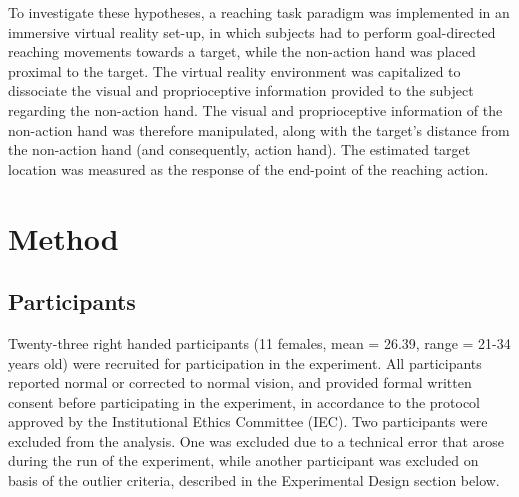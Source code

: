 
To investigate these hypotheses, a reaching task paradigm was implemented in an immersive virtual reality set-up, in which subjects had to perform goal-directed reaching movements towards a target, while the non-action hand was placed proximal to the target. The virtual reality environment was capitalized to dissociate the visual and proprioceptive information provided to the subject regarding the non-action hand. The visual and proprioceptive information of the non-action hand was therefore manipulated, along with the target's distance from the non-action hand (and consequently, action hand). The estimated target location was measured as the response of the end-point of the reaching action. 
 


\section{Method}

\subsection{Participants}
Twenty-three right handed participants (11 females, mean = 26.39, range = 21-34 years old) were recruited for participation in the experiment. All participants reported normal or corrected to normal vision, and provided formal written consent before participating in the experiment, in accordance to the protocol approved by the Institutional Ethics Committee (IEC). Two participants were excluded from the analysis. One was excluded due to a technical error that arose during the run of the experiment, while another participant was excluded on basis of the outlier criteria, described in the Experimental Design section below.

